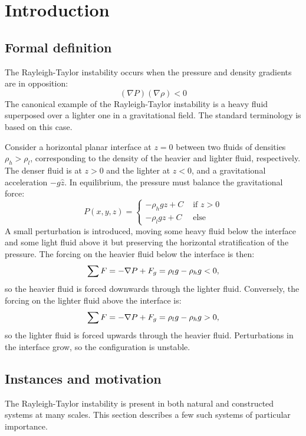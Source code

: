 \chapter{Introduction}

\section{Formal definition}
The Rayleigh-Taylor instability occurs when the pressure and density gradients are in opposition:
\begin{equation}
(\nabla P)(\nabla \rho) < 0
\end{equation}
The canonical example of the Rayleigh-Taylor instability is a heavy fluid superposed over a lighter one in a gravitational field.
The standard terminology is based on this case.

Consider a horizontal planar interface at $z=0$ between two fluids of densities $\rho_h > \rho_l$, corresponding to the density of the heavier and lighter fluid, respectively.
The denser fluid is at $z > 0$ and the lighter at $z < 0$, and a gravitational acceleration $-g \hat{z}$.
In equilibrium, the pressure must balance the gravitational force:
\begin{equation}
P(x,y,z) = \begin{cases}- \rho_h g z + C& \text{ if } z > 0 \\
                        - \rho_l g z + C& \text{ else}
           \end{cases}
\end{equation}
A small perturbation is introduced, moving some heavy fluid below the interface and some light fluid above it but preserving the horizontal stratification of the pressure.
The forcing on the heavier fluid below the interface is then:
\begin{equation}\elabel{force1}
\sum F = - \nabla P + F_g = \rho_l g  - \rho_h g < 0,
\end{equation}
so the heavier fluid is forced downwards through the lighter fluid.
Conversely, the forcing on the lighter fluid above the interface is:
\begin{equation} \elabel{force2}
\sum F = - \nabla P + F_g = \rho_l g  - \rho_h g > 0,
\end{equation}
so the lighter fluid is forced upwards through the heavier fluid.
Perturbations in the interface grow, so the configuration is unstable.

\section{Instances and motivation}
The Rayleigh-Taylor instability is present in both natural and constructed systems at many scales.
This section describes a few such systems of particular importance.


